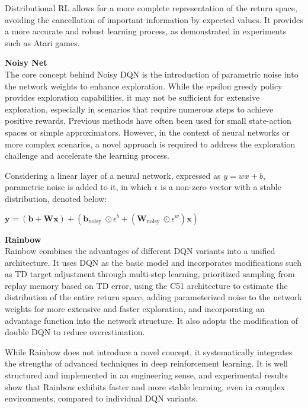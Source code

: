 \documentclass{article}
\begin{document}
Distributional RL allows for a more complete representation of the return space, avoiding the cancellation of important information by expected values. It provides a more accurate and robust learning process, as demonstrated in experiments such as Atari games.

\hspace*{\fill}

\noindent
\textbf{Noisy Net}\\
\noindent
The core concept behind Noisy DQN is the introduction of parametric noise into the network weights to enhance exploration. While the epsilon greedy policy provides exploration capabilities, it may not be sufficient for extensive exploration, especially in scenarios that require numerous steps to achieve positive rewards. Previous methods have often been used for small state-action spaces or simple approximators. However, in the context of neural networks or more complex scenarios, a novel approach is required to address the exploration challenge and accelerate the learning process.

Considering a linear layer of a neural network, expressed as $y=wx+b$, parametric noise is added to it, in which $\epsilon$ is a non-zero vector with a stable distribution, denoted below:

\hspace*{\fill}

$\boldsymbol{y}=(\boldsymbol{b}+\mathbf{W} \boldsymbol{x})+\left(\boldsymbol{b}_{\text {noisy }} \odot \epsilon^b+\left(\mathbf{W}_{\text {noisy }} \odot \epsilon^w\right) \boldsymbol{x}\right)$

\hspace*{\fill}

\noindent
\textbf{Rainbow}\\
\noindent
Rainbow combines the advantages of different DQN variants into a unified architecture. It uses DQN as the basic model and incorporates modifications such as TD target adjustment through multi-step learning, prioritized sampling from replay memory based on TD error, using the C51 architecture to estimate the distribution of the entire return space, adding parameterized noise to the network weights for more extensive and faster exploration, and incorporating an advantage function into the network structure. It also adopts the modification of double DQN to reduce overestimation.

While Rainbow does not introduce a novel concept, it systematically integrates the strengths of advanced techniques in deep reinforcement learning. It is well structured and implemented in an engineering sense, and experimental results show that Rainbow exhibits faster and more stable learning, even in complex environments, compared to individual DQN variants.
\end{document}
